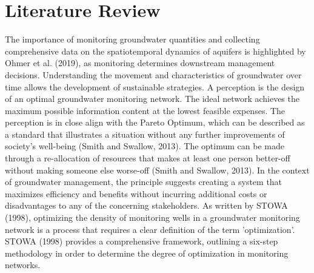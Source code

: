 \chapter{Literature Review}

The importance of monitoring groundwater quantities and collecting comprehensive data on the spatiotemporal dynamics of aquifers is highlighted by Ohmer et al. (2019), as monitoring determines downstream management decisions. Understanding the movement and characteristics of groundwater over time allows the development of sustainable strategies. A perception is the design of an optimal groundwater monitoring network. The ideal network achieves the maximum possible information content at the lowest feasible expenses. The perception is in close align with the Pareto Optimum, which can be described as a standard that illustrates a situation without any further improvements of society's well-being (Smith and Swallow, 2013). The optimum can be made through a re-allocation of resources that makes at least one person better-off without making someone else worse-off (Smith and Swallow, 2013).  In the context of groundwater management, the principle suggests creating a system that maximizes efficiency and benefits without incurring additional costs or disadvantages to any of the concerning stakeholders. As written by STOWA (1998), optimizing the density of monitoring wells in a groundwater monitoring network is a process that requires a clear definition of the term 'optimization'. STOWA (1998) provides a comprehensive framework, outlining a six-step methodology in order to determine the degree of optimization in monitoring networks. 

